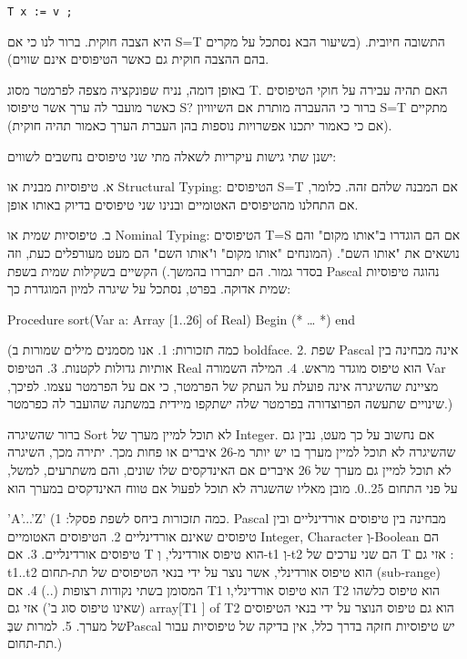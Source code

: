 \begin{verbatim}
T x := v ;

\end{verbatim}

      היא הצבה חוקית. ברור לנו כי אם S=T התשובה חיובית. (בשיעור הבא נסתכל על מקרים בהם ההצבה חוקית גם כאשר הטיפוסים אינם שווים).

      באופן דומה, נניח שפונקציה מצפה לפרמטר מסוג T. האם תהיה עבירה על חוקי הטיפוסים כאשר מועבר לה ערך אשר טיפוסו S? ברור כי ההעברה מותרת אם השיוויון S=T מתקיים (אם כי כאמור יתכנו אפשרויות נוספות בהן העברת הערך כאמור תהיה חוקית).

      ישנן שתי גישות עיקריות לשאלה מתי שני טיפוסים נחשבים לשווים:

      א. טיפוסיות מבנית או Structural Typing: הטיפוסים S=T אם המבנה שלהם זהה. כלומר, אם התחלנו מהטיפוסים האטומיים ובנינו שני טיפוסים בדיוק באותו אופן.

      ב. טיפוסיות שמית או Nominal Typing: הטיפוסים T=S אם הם הוגדרו ב"אותו מקום" והם נושאים את "אותו השם". (המונחים "אותו מקום" ו"אותו השם" הם מעט מעורפלים כעת, וזה בסדר גמור. הם יתבררו בהמשך.)
      הקשיים בשקילות שמית
      בשפת Pascal נהוגה טיפוסיות שמית אדוקה. בפרט, נסתכל על שיגרה למיון המוגדרת כך:

      Procedure sort(Var a: Array [1..26] of Real)
      Begin
      (* … *)
      end

      (כמה תזכורות:
      1. אנו מסמנים מילים שמורות ב boldface.
      2. שפת Pascal אינה מבחינה בין אותיות גדולות לקטנות.
      3. הטיפוס Real הוא טיפוס מוגדר מראש.
      4. המילה השמורה Var מציינת שהשיגרה אינה פועלת על העתק של הפרמטר, כי אם על הפרמטר עצמו. לפיכך, שינויים שתעשה הפרוצדורה בפרמטר שלה ישתקפו מיידית במשתנה שהועבר לה כפרמטר.)

      ברור שהשיגרה Sort לא תוכל למיין מערך של Integer. אם נחשוב על כך מעט, נבין גם שהשיגרה לא תוכל למיין מערך בו יש יותר מ-26 איברים או פחות מכך. יתירה מכך, השיגרה לא תוכל למיין גם מערך של 26 איברים אם האינדקסים שלו שונים, והם משתרעים, למשל, על פני התחום 25..0. מובן מאליו שהשגרה לא תוכל לפעול אם טווח האינדקסים במערך הוא

      ’A’...’Z’
      (כמה תזכורות ביחס לשפת פסקל:
      1. Pascal מבחינה בין טיפוסים אורדינליים ובין טיפוסים שאינם אורדינליים
      2. הטיפוסים האטומיים Integer, Character וְ-Boolean הם טיפוסים אורדינליים.
      3. אם T הוא טיפוס אורדינלי, וְ-t1 וְ-t2 הם שני ערכים של T אזי גם : t1..t2 הוא טיפוס אורדינלי, אשר נוצר על ידי בנאי הטיפוסים של תת-תחום (sub-range) המסומן בשתי נקודות רצופות (..)
      4. אם T1 הוא טיפוס אורדינלי,ו T2 הוא טיפוס כלשהו (שאינו טיפוס סוג ב') אזי גם array[T1 ] of T2 הוא גם טיפוס הנוצר על ידי בנאי הטיפוסים של מערך.
      5. למרות שבְּPascal יש טיפוסיות חזקה בדרך כלל, אין בדיקה של טיפוסיות עבור תת-תחום.)

